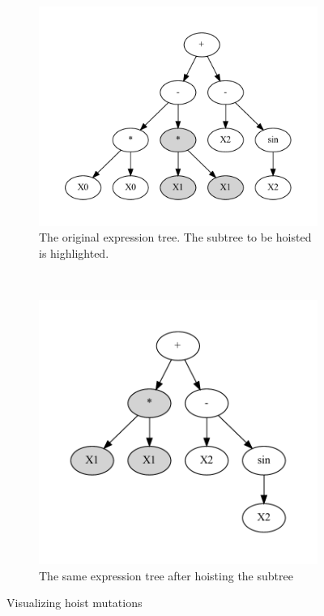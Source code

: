 \begin{figure}[htp]
  \centering
  \begin{subfigure}{\textwidth}
    \centering
    \includegraphics[scale=0.8]{images/graphviz/hoist_mut_before.dot.pdf}
    \caption{The original expression tree. The subtree to be hoisted is highlighted.}
    \label{fig:hoist_muta}
  \end{subfigure}%
  \\
  \begin{subfigure}{\textwidth}
    \centering
    \includegraphics[scale=0.8]{images/graphviz/hoist_mut_after.dot.pdf}
    \caption{The same expression tree after hoisting the subtree}
    \label{fig:hoist_mutb}
  \end{subfigure}
  \caption{Visualizing hoist mutations}
  
  \label{fig:hoist_mut}
\end{figure}

